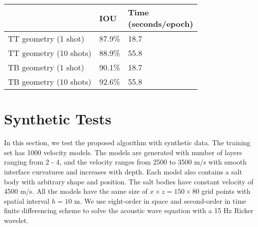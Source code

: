 \documentclass[manuscript,ulem,graphix,revised]{geophysics}
\begin{document}
{
  \begin{center}
  \begin{tabular}{|l|l|l|}
  \hline
                            & IOU    & \makecell{Time \\(seconds/epoch)} \\ \hline
  {TT geometry (1 shot)}    & 87.9\% & 18.7          \\ \hline
  {TT geometry (10 shots)}  & 88.9\% & 55.8          \\ \hline
  {TB geometry (1 shot)}    & 90.1\% & 18.7          \\ \hline
  {TB geometry (10 shots)}  & 92.6\% & 55.8          \\ \hline
  \end{tabular}
  \end{center}
}



\section{Synthetic Tests}
In this section, we test the proposed algorithm with synthetic data. 
The training set has 1000 velocity models. The models are generated with number of layers ranging from 2 - 4, and the velocity ranges from 2500 to 3500 m/s with smooth interface curvatures and increases with depth. Each model also contains a salt body with arbitrary shape and position. The salt bodies have constant velocity of 4500 m/s. All the models have the same size of $x\times z = 150 \times 80$ grid points with spatial interval $h=10$ m. 
We use eight-order in space and second-order in time finite differencing scheme to solve the acoustic wave equation with a 15 Hz Ricker wavelet.
\end{document}
